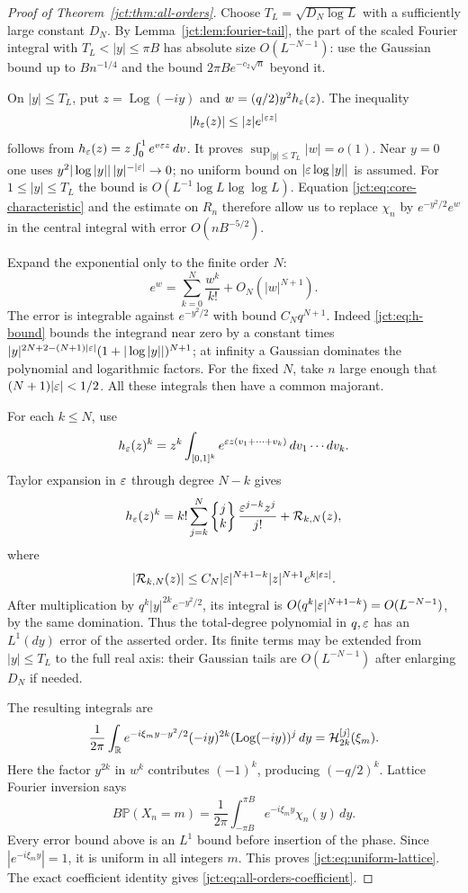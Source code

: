 \begin{proof}[Proof of Theorem~\ref{jct:thm:all-orders}]
Choose
$T_L=\sqrt{D_N\log L}$ with a sufficiently large constant $D_N$.
By Lemma~\ref{jct:lem:fourier-tail}, the part of the scaled Fourier integral
with $T_L<|y|\le\pi B$ has absolute size
$O(L^{-N-1})$: use the Gaussian bound up to $Bn^{-1/4}$ and
the bound $2\pi B e^{-c_2\sqrt n}$ beyond it.

On $|y|\le T_L$, put $z=\operatorname{Log}(-iy)$ and
$w=(q/2)y^2h_\varepsilon(z)$. The inequality
\begin{equation}\label{jct:eq:h-bound}
 |h_\varepsilon(z)|\le |z|e^{|\varepsilon z|}
\end{equation}
follows from $h_\varepsilon(z)=z\int_0^1e^{v\varepsilon z}\,dv$.
It proves $\sup_{|y|\le T_L}|w|=o(1)$. Near $y=0$ one uses
$y^2|\log|y||\,|y|^{-|\varepsilon|}\to0$; no uniform bound on
$|\varepsilon\log|y||$ is assumed. For $1\le|y|\le T_L$ the bound is
$O(L^{-1}\log L\log\log L)$.
Equation \eqref{jct:eq:core-characteristic} and the estimate on $R_n$
therefore allow us to replace $\chi_n$ by
$e^{-y^2/2}e^w$ in the central integral with error
$O(nB^{-5/2})$.

Expand the exponential only to the finite order $N$:
\[
 e^w=\sum_{k=0}^N\frac{w^k}{k!}+O_N(|w|^{N+1}).
\]
The error is integrable against $e^{-y^2/2}$ with bound
$C_N q^{N+1}$. Indeed \eqref{jct:eq:h-bound} bounds the integrand near
zero by a constant times
$|y|^{2N+2-(N+1)|\varepsilon|}(1+|\log|y||)^{N+1}$;
at infinity a Gaussian dominates the polynomial and logarithmic
factors. For the fixed $N$, take $n$ large enough that
$(N+1)|\varepsilon|<1/2$. All these integrals then have a common majorant.

For each $k\le N$, use
\begin{equation}\label{jct:eq:cube-integral}
 h_\varepsilon(z)^k=z^k\int_{[0,1]^k}
      e^{\varepsilon z(v_1+\cdots+v_k)}\,dv_1\cdots dv_k.
\end{equation}
Taylor expansion in $\varepsilon$ through degree $N-k$ gives
\[
 h_\varepsilon(z)^k
 =k!\sum_{j=k}^N\left\{\begin{matrix}j\\k\end{matrix}\right\}\frac{\varepsilon^{j-k}z^j}{j!}
    +\mathcal R_{k,N}(z),
\]
where
\[
 |\mathcal R_{k,N}(z)|\le
 C_N|\varepsilon|^{N+1-k}|z|^{N+1}e^{k|\varepsilon z|}.
\]
After multiplication by $q^k|y|^{2k}e^{-y^2/2}$, its integral is
$O(q^k|\varepsilon|^{N+1-k})=O(L^{-N-1})$, by the same domination.
Thus the total-degree polynomial in $q,\varepsilon$ has an $L^1(dy)$
error of the asserted order. Its finite terms may be extended from
$|y|\le T_L$ to the full real axis: their Gaussian tails are
$O(L^{-N-1})$ after enlarging $D_N$ if needed.

The resulting integrals are
\[
 \frac1{2\pi}\int_\mathbb R e^{-i\xi_m y-y^2/2}
       (-iy)^{2k}(\operatorname{Log}(-iy))^j\,dy
       =\mathcal{H}_{2k}^{[j]}(\xi_m).
\]
Here the factor $y^{2k}$ in $w^k$ contributes $(-1)^k$, producing
$(-q/2)^k$. Lattice Fourier inversion says
\[
 B\mathbb{P}(X_n=m)
 =\frac1{2\pi}\int_{-\pi B}^{\pi B}
                 e^{-i\xi_m y}\chi_n(y)\,dy.
\]
Every error bound above is an $L^1$ bound before insertion of the
phase. Since $|e^{-i\xi_m y}|=1$, it is uniform in all integers $m$.
This proves \eqref{jct:eq:uniform-lattice}. The exact coefficient identity
gives \eqref{jct:eq:all-orders-coefficient}.


\end{proof}
